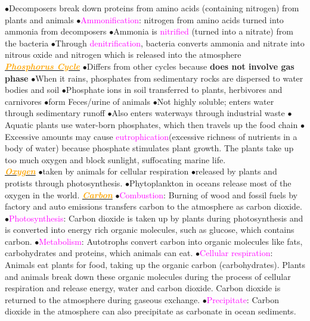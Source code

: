 \documentclass{article}
\newcommand{\ddd}{$\bullet$}
\newcommand{\pink}[1]{\textcolor{magenta}{#1}}
\newcommand{\orange}[1]{\textcolor{orange}{#1}}
\newcommand{\mysubsection}[1]{\underline{\textbf{{\textit{\orange{#1}}}}}}
\newcommand{\vocab}[1]{{\pink{#1}}}
\begin{document}
\begin{multicols*}{4}
            \ddd Decomposers break down proteins from amino acids (containing nitrogen) from plants and animals 
            \ddd \vocab{Ammonification}: nitrogen from amino acids turned into ammonia from decomposers
            \ddd Ammonia is \vocab{nitrified} (turned into a nitrate) from the bacteria
            \ddd Through \vocab{denitrification}, bacteria converts ammonia and nitrate into nitrous oxide and nitrogen which is released into the atmosphere
    \\
        \mysubsection{Phosphorus Cycle}
            \ddd Differs from other cycles because \textbf{does not involve gas phase}
            \ddd When it rains, phosphates from sedimentary rocks are dispersed to water bodies and soil
            \ddd Phosphate ions in soil transferred to plants, herbivores and carnivores
            \ddd form Feces/urine of animals
            \ddd Not highly soluble; enters water through sedimentary runoff
            \ddd Also enters waterways through industrial waste
            \ddd Aquatic plants use water-born phosphates, which then travels up the food chain
            \ddd Excessive amounts may cause \vocab{eutrophication}(excessive richness of nutrients in a body of water) because phosphate stimulates plant growth. The plants take up too much oxygen and block sunlight, suffocating marine life. 
        \\
        \mysubsection{Oxygen}
            \ddd taken by animals for cellular respiration
            \ddd released by plants and protists through photosynthesis.
            \ddd Phytoplankton in oceans release most of the oxygen in the world.
        \mysubsection{Carbon}
            \ddd \vocab{Combustion}: Burning of wood and fossil fuels by factory and auto emissions transfers carbon to the atmosphere as carbon dioxide.
            \ddd \vocab{Photosynthesis}: Carbon dioxide is taken up by plants during photosynthesis and is converted into energy rich organic molecules, such as glucose, which contains carbon.
            \ddd \vocab{Metabolism}: Autotrophs convert carbon into organic molecules like fats, carbohydrates and proteins, which animals can eat.
            \ddd \vocab{Cellular respiration}: Animals eat plants for food, taking up the organic carbon (carbohydrates). Plants and animals break down these organic molecules during the process of cellular respiration and release energy, water and carbon dioxide. Carbon dioxide is returned to the atmosphere during gaseous exchange. 
            \ddd \vocab{Precipitate}: Carbon dioxide in the atmosphere can also precipitate as carbonate in ocean sediments.

\end{multicols*}
\end{document}
